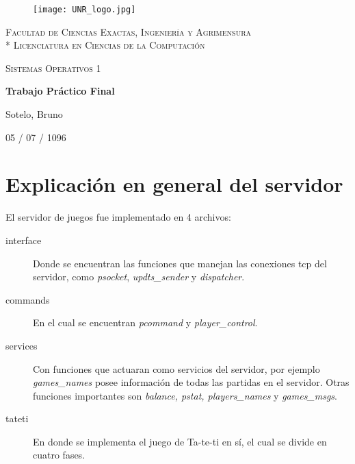 \documentclass[a4paper]{report}
\begin{document}
\begin{titlepage}
\centering
\begin{figure}[H]
    \begin{center}
        \texttt{[image: UNR\_logo.jpg]}
    \end{center}
\end{figure}
{\scshape\large Facultad de Ciencias Exactas, Ingenier\'ia y Agrimensura\\*
                 Licenciatura en Ciencias de la Computaci\'on\par}
\vspace{5cm}
{\scshape\LARGE Sistemas Operativos 1 \par}
{\huge\bfseries Trabajo Pr\'actico Final \par}
\vspace{3cm}
{\Large Sotelo, Bruno\par}
\vfill
{\large 05 / 07 / 1096 \par}
\end{titlepage}


\section*{Explicación en general del servidor}

El servidor de juegos fue implementado en 4 archivos:
\begin{description}
	\item[interface] Donde se encuentran las funciones que manejan
		las conexiones tcp del servidor, como \textit{psocket}, 
		\textit{updts\_sender} y \textit{dispatcher}.
	\item[commands] En el cual se encuentran \textit{pcommand} y 
		\textit{player\_control}.
	\item[services] Con funciones que actuaran como servicios
		del servidor, por ejemplo \textit{games\_names} posee información
		de todas las partidas en el servidor. Otras funciones importantes
		son \textit{balance, pstat, players\_names} y \textit{games\_msgs}.
	\item[tateti] En donde se implementa el juego de Ta-te-ti en sí, el
		cual se divide en cuatro fases.
\end{description}
\end{document}

